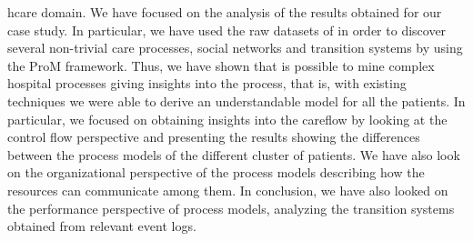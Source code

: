 hcare domain. We have focused on the analysis of the results obtained for our case study. In particular, we have used the raw datasets of \hospital in order to discover several non-trivial care processes, social networks and transition systems by using the ProM framework. Thus, we have shown that is possible to mine complex hospital processes giving insights into the process, that is, with existing techniques we were able to derive an understandable model for all the patients. In particular, we focused on obtaining insights into the careflow by looking at
the control flow perspective and presenting the results showing the differences between the process models of the different cluster of patients. We have also look on the organizational perspective of the process models describing how the resources can communicate among them. In conclusion, we have also looked on the performance perspective of process models, analyzing the transition systems obtained from relevant event logs.


